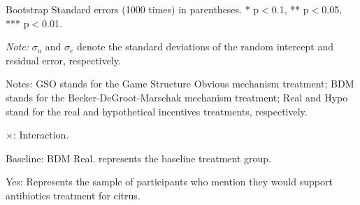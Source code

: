 \documentclass[12pt]{article}
\begin{document}
\begin{table}[H]
\begin{tablenotes}
            \footnotesize
            \item Bootstrap Standard errors (1000 times) in parentheses. * p$<$0.1, ** p$<$0.05, *** p$<$0.01.
            \item \textit{Note:} $\sigma_u$ and $\sigma_e$ denote the standard deviations of the random intercept and residual error, respectively.
            \item Notes: GSO stands for the Game Structure Obvious mechanism treatment; BDM stands for the Becker-DeGroot-Marschak mechanism treatment; Real and Hypo stand for the real and hypothetical incentives treatments, respectively.
           \item $\times$: Interaction.
           \item Baseline: BDM Real. represents the baseline treatment group. 
           \item Yes: Represents the sample of participants who mention they would support antibiotics treatment for citrus.
        \end{tablenotes}
\end{table}

\clearpage
\end{document}
